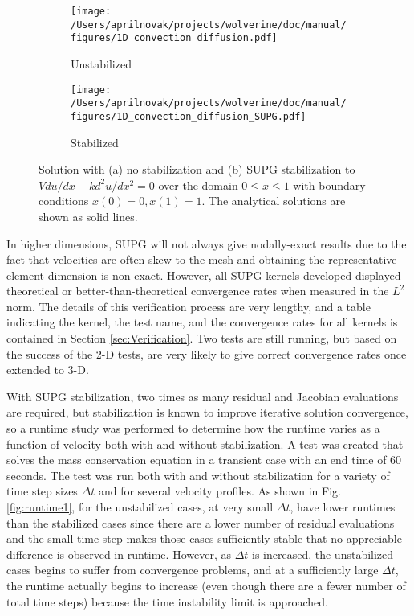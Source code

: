 \documentclass[10pt]{article}
\numberwithin{equation}{section} %
\begin{document}
\begin{figure}[H]
\centering
\begin{subfigure}{.45\textwidth}
  \centering
  \texttt{[image: /Users/aprilnovak/projects/wolverine/doc/manual/figures/1D\_convection\_diffusion.pdf]}
  \caption{Unstabilized}
\end{subfigure}
\begin{subfigure}{.45\textwidth}
  \centering
  \texttt{[image: /Users/aprilnovak/projects/wolverine/doc/manual/figures/1D\_convection\_diffusion\_SUPG.pdf]}
  \caption{Stabilized}
\end{subfigure}
\caption{Solution with (a) no stabilization and (b) SUPG stabilization to \(V du/dx-kd^2u/dx^2=0\) over the domain \(0\leq x\leq 1\) with boundary conditions \(x(0)=0, x(1)=1\). The analytical solutions are shown as solid lines.}
\label{fig:1D}
\end{figure}

In higher dimensions, SUPG will not always give nodally-exact results due to the fact that velocities are often skew to the mesh and obtaining the representative element dimension is non-exact. However, all SUPG kernels developed displayed theoretical or better-than-theoretical convergence rates when measured in the \(L^2\) norm. The details of this verification process are very lengthy, and a table indicating the kernel, the test name, and the convergence rates for all kernels is contained in Section \ref{sec:Verification}. Two tests are still running, but based on the success of the 2-D tests, are very likely to give correct convergence rates once extended to 3-D.\newline 

With SUPG stabilization, two times as many residual and Jacobian evaluations are required, but stabilization is known to improve iterative solution convergence, so a runtime study was performed to determine how the runtime varies as a function of velocity both with and without stabilization. A test was created that solves the mass conservation equation in a transient case with an end time of 60 seconds. The test was run both with and without stabilization for a variety of time step sizes \(\Delta t\) and for several velocity profiles. As shown in Fig. \ref{fig:runtime1}, for the unstabilized cases, at very small \(\Delta t\), have lower runtimes than the stabilized cases since there are a lower number of residual evaluations and the small time step makes those cases sufficiently stable that no appreciable difference is observed in runtime. However, as \(\Delta t\) is increased, the unstabilized cases begins to suffer from convergence problems, and at a sufficiently large \(\Delta t\), the runtime actually begins to increase (even though there are a fewer number of total time steps) because the time instability limit is approached. 
\end{document}
